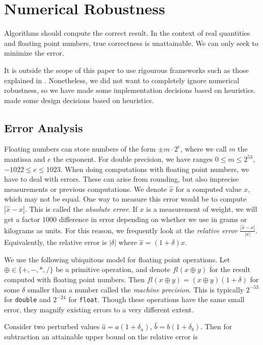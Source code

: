 \section{Numerical Robustness}

Algorithms should compute the correct result. In the context of real quantities
and floating point numbers, true correctness is unattainable. We can only
seek to minimize the error. 

It is outside the scope of this paper to use rigourous frameworks such as those 
explained in \cite{Higham, Jiang06}.
Nonetheless, we did not want to completely ignore numerical robustness, so we 
have made some implementation decisions based on heuristics.
made some design decisions based on heuristics.

\subsection{Error Analysis}

Floating numbers can store numbers of the form $\pm m \cdot 2^e$,
where we call $m$ the mantissa and $e$ the exponent. For double precision,
we have ranges $0 \leq m \leq 2^{53}$, $-1022 \leq e \leq 1023$.
When doing computations with floating point numbers, we have to deal with
errors. These can arise from rounding, but also imprecise measurements or
previous computations. We denote $\hat{x}$ for a computed value $x$, which
may not be equal. One way to measure this error would be to compute
$|\hat{x} - x|$. This is called the \textit{absolute error}. If $x$ is a
measurement of weight, we will get a factor $1000$ difference in error
depending on whether we use in grams or kilograms as units. For this reason,
we frequently look at the \textit{relative error} $\frac{|\hat{x} - x|}{|x|}$.
Equivalently, the relative error is $|\delta|$ where $\hat{x} = (1 + \delta)x$.

We use the following ubiquitous model for floating point operations. Let
$\oplus \in \{+, -, *, /\}$ be a primitive operation, and denote 
$fl(x \oplus y)$ for the result computed with floating point numbers. Then
$fl(x \oplus y) = (x \oplus y)(1 + \delta)$ for some $\delta$ smaller than
a number called the \textit{machine precision}. This is typically $2^{-53}$
for \texttt{double} and $2^{-24}$ for \texttt{float}. Though these operations
have the same small error, they magnify existing errors to a very different
extent.

Consider two perturbed values $\hat{a} = a(1 + \delta_a)$,
$\hat{b} = b(1 + \delta_b)$. Then for subtraction an attainable
upper bound on the relative error is

